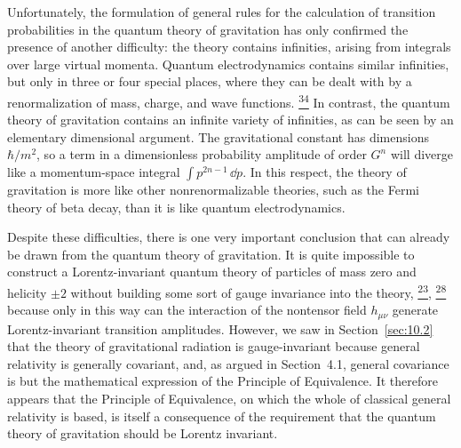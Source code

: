 Unfortunately, the formulation of general rules for the calculation of
transition probabilities in the quantum theory of gravitation has only
confirmed the presence of another difficulty: the theory contains infinities,
arising from integrals over large virtual momenta. Quantum electrodynamics
contains similar infinities, but only in three or four special places, where
they can be dealt with by a renormalization of mass, charge, and wave
functions.%
\hyperref[ch10-ref-34]{\textsuperscript{34}}
In contrast, the quantum theory of gravitation contains an infinite variety of
infinities, as can be seen by an elementary dimensional argument. The
gravitational constant has dimensions \(\hbar/m^2\), so a term in a
dimensionless probability amplitude of order \(G^n\) will diverge like a
momentum-space integral \(\int p^{2n-1}\,\dd p\). In this respect, the theory
of gravitation is more like other nonrenormalizable theories, such as the
Fermi theory of beta decay, than it is like quantum electrodynamics.

Despite these difficulties, there is one very important conclusion that can
already be drawn from the quantum theory of gravitation. It is quite
impossible to construct a Lorentz-invariant quantum theory of particles of
mass zero and helicity \(\pm2\) without building some sort of gauge invariance
into the theory,%
\hyperref[ch10-ref-23]{\textsuperscript{23}},%
\hyperref[ch10-ref-28]{\textsuperscript{28}}
because only in this way can the interaction of the nontensor field
\(h_{\mu\nu}\) generate Lorentz-invariant transition amplitudes. However, we
saw in Section~\ref{sec:10.2} that the theory of gravitational radiation is
gauge-invariant because general relativity is generally covariant, and, as
argued in Section~4.1, general covariance is but the mathematical expression
of the Principle of Equivalence. It therefore appears that the Principle of
Equivalence, on which the whole of classical general relativity is based, is
itself a consequence of the requirement that the quantum theory of gravitation
should be Lorentz invariant.
